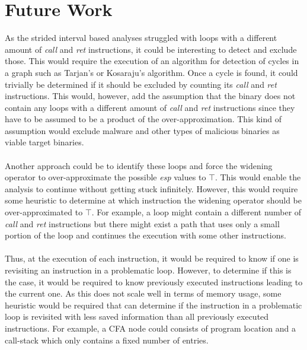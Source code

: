 \documentclass{kththesis}
\newcommand{\fbcomment}[1]{{#1}}
\renewcommand{\fbcomment}[1]{}
\renewcommand{\it}[1]{\textit{#1}}
\begin{document}
\section{Future Work}
\fbcomment{\color{red}Goal: Describe how the work in this thesis can be extended.}
As the strided interval based analyses struggled with loops with a different amount of \it{call} and \it{ret} instructions, it could be interesting to detect and exclude those. This would require the execution of an algorithm for detection of cycles in a graph such as Tarjan's or Kosaraju's algorithm\cite{Tarjan}\cite{Kosaraju}. Once a cycle is found, it could trivially be determined if it should be excluded by counting its \it{call} and \it{ret} instructions. This would, however, add the assumption that the binary does not contain any loops with a different amount of \it{call} and \it{ret} instructions since they have to be assumed to be a product of the over-approximation. This kind of assumption would exclude malware and other types of malicious binaries as viable target binaries.
\\ \\
Another approach could be to identify these loops and force the widening operator to over-approximate the possible \it{esp} values to $\top$. This would enable the analysis to continue without getting stuck infinitely. However, this would require some heuristic to determine at which instruction the widening operator should be over-approximated to $\top$. For example, a loop might contain a different number of \it{call} and \it{ret} instructions but there might exist a path that uses only a small portion of the loop and continues the execution with some other instructions. 
\\ \\
Thus, at the execution of each instruction, it would be required to know if one is revisiting an instruction in a problematic loop. However, to determine if this is the case, it would be required to know previously executed instructions leading to the current one. As this does not scale well in terms of memory usage, some heuristic would be required that can determine if the instruction in a problematic loop is revisited with less saved information than all previously executed instructions. For example, a CFA node could consists of program location and a call-stack which only contains a fixed number of entries.
\\ \\
\end{document}
